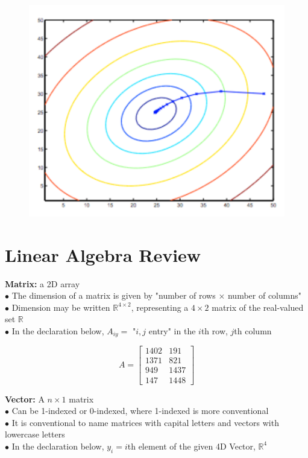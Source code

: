 \begin{figure}[hbt!]
    \centering
    \includegraphics[scale=0.75]{Resources/Contour2}
\end{figure}



\pagebreak
\section{Linear Algebra Review}
\textbf{Matrix:} a 2D array \\
$\bullet$ The dimension of a matrix is given by "number of rows $\times$ number of columns" \\
$\bullet$ Dimension may be written $\mathbb{R}^{4\times 2}$, representing a $4\times2$ matrix of the
real-valued set $\mathbb{R}$ \\
$\bullet$ In the declaration below, $A_{iy}=$ "$i,j$ entry" in the $i$th row, $j$th column

\begin{equation*}
    A = \begin{bmatrix}
            1402 & 191 \\
            1371 & 821 \\
            949  & 1437 \\
            147  & 1448
    \end{bmatrix}
\end{equation*}

\noindent \textbf{Vector:} A $n\times1$ matrix \\
$\bullet$ Can be 1-indexed or 0-indexed, where 1-indexed is more conventional \\
$\bullet$ It is conventional to name matrices with capital letters and vectors with lowercase letters \\
$\bullet$ In the declaration below, $y_i=i$th element of the given 4D Vector, $\mathbb{R}^4$

